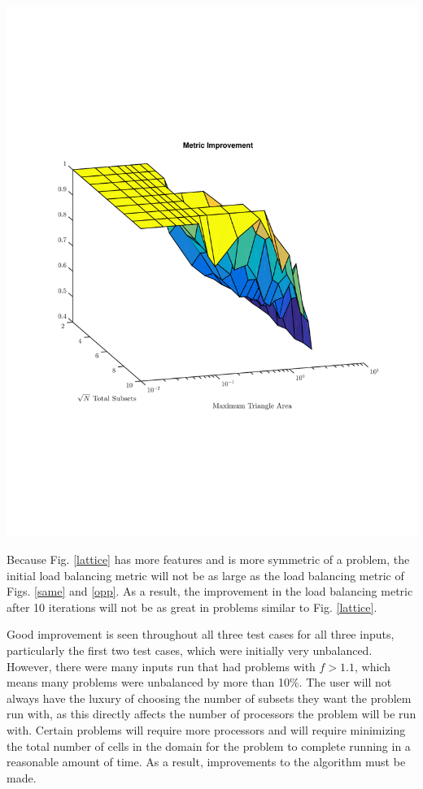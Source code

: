 \noindent\begin{minipage}{\textwidth}
\centering
\includegraphics[scale=0.80, trim = 2cm 6cm 2cm 7cm,clip]{figures/lattice_diff.pdf}
\label{latticediff}
\end{minipage}
\smallskip

Because Fig. \ref{lattice} has more features and is more symmetric of a problem, the initial load balancing metric will not be as large as the load balancing metric of Figs. \ref{same} and \ref{opp}. As a result, the improvement in the load balancing metric after 10 iterations will not be as great in problems similar to Fig. \ref{lattice}. 

Good improvement is seen throughout all three test cases for all three inputs, particularly the first two test cases, which were initially very unbalanced. However, there were many inputs run that had problems with $f > 1.1$, which means many problems were unbalanced by more than 10\%. The user will not always have the luxury of choosing the number of subsets they want the problem run with, as this directly affects the number of processors the problem will be run with. Certain problems will require more processors and will require minimizing the total number of cells in the domain for the problem to complete running in a reasonable amount of time. As a result, improvements to the algorithm must be made. 

